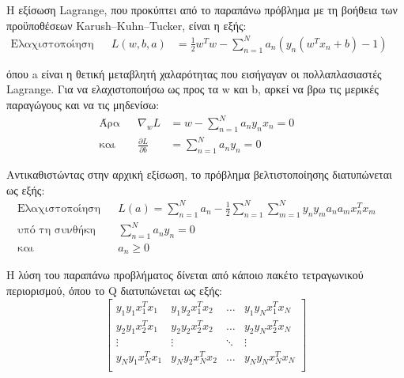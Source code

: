 	Η εξίσωση Lagrange, που προκύπτει από το παραπάνω πρόβλημα με τη βοήθεια των προϋποθέσεων Karush–Kuhn–Tucker, είναι η εξής:
	\begin{align}
	\text{Ελαχιστοποίηση} &&L(w,b,a)&= \frac{1}{2} w^T w - \sum_{n=1}^{N} a_n (y_n(w^T x_n +b) -1) &&
	\end{align}
	
	όπου a είναι η θετική μεταβλητή χαλαρότητας που εισήγαγαν οι πολλαπλασιαστές Lagrange.
	Για να ελαχιστοποιήσω ως προς τα w και b, αρκεί να βρω τις μερικές παραγώγους και να τις μηδενίσω:
	\begin{align}
	\text{Άρα} && \nabla_w L &= w-\sum_{n=1}^{N} a_n y_n x_n=0  &&\\
	\text{και} && \frac{\partial L}{\partial b}&= \sum_{n=1}^{N} a_n y_n =0 &&
	\end{align}
	
	Αντικαθιστώντας στην αρχική εξίσωση, το πρόβλημα βελτιστοποίησης διατυπώνεται ως εξής:
	\begin{align}
	\text{Ελαχιστοποίηση} && L(a)= \sum_{n=1}^{N} a_n - \frac{1}{2} \sum_{n=1}^{N} \sum_{m=1}^{N} y_n y_m a_n a_m x_n^T x_m  &&\\
	\text{υπό τη συνθήκη} && \sum_{n=1}^{N} a_n y_n =0 &&\\
	\text{και} && a_n \geq 0  &&
	\end{align}
		
		Η λύση του παραπάνω προβλήματος δίνεται από κάποιο πακέτο τετραγωνικού περιορισμού, όπου το Q διατυπώνεται ως εξής:
		\[
		\begin{bmatrix}
		y_1y_1x_1^Tx_1 & y_1y_2x_1^Tx_2   & \dots  &  y_1y_Nx_1^Tx_N \\
		y_2y_1x_2^Tx_1 & y_2y_2x_2^Tx_2   & \dots  &  y_2y_Nx_2^Tx_N \\
		\vdots  & \vdots &\ddots & \vdots \\
		y_Ny_1x_N^Tx_ 1& y_Ny_2x_N^Tx_2   & \dots  &  y_Ny_Nx_N^Tx_N \\
		\end{bmatrix}
		\]
		

